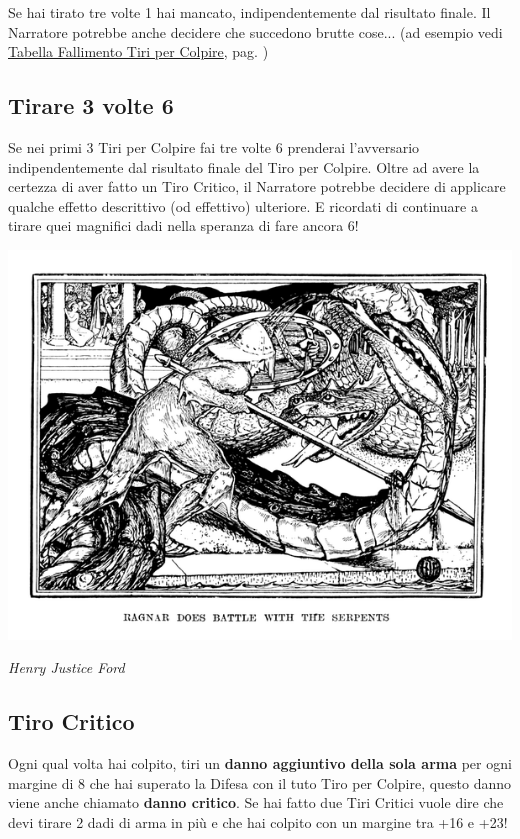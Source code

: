 \begin{multicols}{2}
Se hai tirato tre volte 1 hai mancato, indipendentemente dal risultato finale. Il Narratore potrebbe anche decidere che succedono brutte cose... (ad esempio vedi \hyperlink{tabellafallimentiarmi}{Tabella Fallimento Tiri per Colpire}, pag. \pageref{tabellafallimentiarmi})


\subsection{Tirare 3 volte 6}\label{tiraretrevoltesei}

Se nei primi 3 Tiri per Colpire fai tre volte 6 prenderai l'avversario indipendentemente dal risultato finale del Tiro per Colpire. Oltre ad avere la certezza di aver fatto un Tiro Critico, il Narratore potrebbe decidere di applicare qualche effetto descrittivo (od effettivo) ulteriore. E ricordati di continuare a tirare quei magnifici dadi nella speranza di fare ancora 6!

\begin{center}
	\includegraphics[width=0.9\linewidth]{immagini/critico.png}

	\emph{Henry Justice Ford}
\end{center}

\subsection{Tiro Critico}\label{tirocritico}

Ogni qual volta hai colpito, tiri un \textbf{danno aggiuntivo della sola arma} per ogni margine di 8 che hai superato la Difesa con il tuto Tiro per Colpire, questo danno viene anche chiamato \textbf{danno critico}. Se hai fatto due Tiri Critici vuole dire che devi tirare 2 dadi di arma in più e che hai colpito con un margine tra +16 e +23!


\end{multicols}
